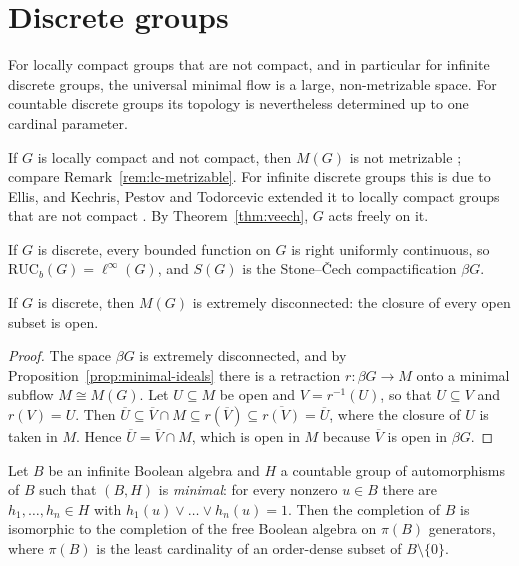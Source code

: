 \section{Discrete groups}\label{sec:discrete}

For locally compact groups that are not compact, and in particular for
infinite discrete groups, the universal minimal flow is a large,
non-metrizable space. For countable discrete groups its topology is
nevertheless determined up to one cardinal parameter.

\begin{remark}[Size]\label{rem:umf-size}
If $G$ is locally compact and not compact, then $M(G)$ is not metrizable
\cite{GlasnerWeiss2003,GiordanoPestov2007}; compare
Remark~\ref{rem:lc-metrizable}. For infinite discrete groups this is due to
Ellis, and Kechris, Pestov and Todorcevic extended it to locally compact
groups that are not compact \cite{GlasnerGutman2012}. By Theorem~\ref{thm:veech}, $G$ acts freely
on it.
\end{remark}

\begin{example}\label{ex:discrete-ambit}
If $G$ is discrete, every bounded function on $G$ is right uniformly
continuous, so $\mathrm{RUC}_b(G)=\ell^\infty(G)$, and $S(G)$ is the
Stone--Čech compactification $\beta G$.
\end{example}

\begin{proposition}\label{prop:extremely-disconnected}
If $G$ is discrete, then $M(G)$ is extremely disconnected: the closure of
every open subset is open.
\end{proposition}

\begin{proof}
The space $\beta G$ is extremely disconnected, and by
Proposition~\ref{prop:minimal-ideals} there is a retraction
$r\colon\beta G\to M$ onto a minimal subflow $M\cong M(G)$. Let $U\subseteq M$
be open and $V=r^{-1}(U)$, so that $U\subseteq V$ and $r(V)=U$. Then
$\overline{U}\subseteq\overline{V}\cap M\subseteq r(\overline{V})
\subseteq\overline{r(V)}=\overline{U}$, where the closure of $U$ is taken in
$M$. Hence $\overline{U}=\overline{V}\cap M$, which is open in $M$ because
$\overline{V}$ is open in $\beta G$.
\end{proof}

\begin{theorem}\label{thm:balcar-blaszczyk}
Let $B$ be an infinite Boolean algebra and $H$ a countable group of
automorphisms of $B$ such that $(B,H)$ is \emph{minimal}: for every nonzero
$u\in B$ there are $h_1,\dots,h_n\in H$ with $h_1(u)\vee\dots\vee h_n(u)=1$.
Then the completion of $B$ is isomorphic to the completion of the free Boolean
algebra on $\pi(B)$ generators, where $\pi(B)$ is the least cardinality of an
order-dense subset of $B\setminus\{0\}$.
\end{theorem}

